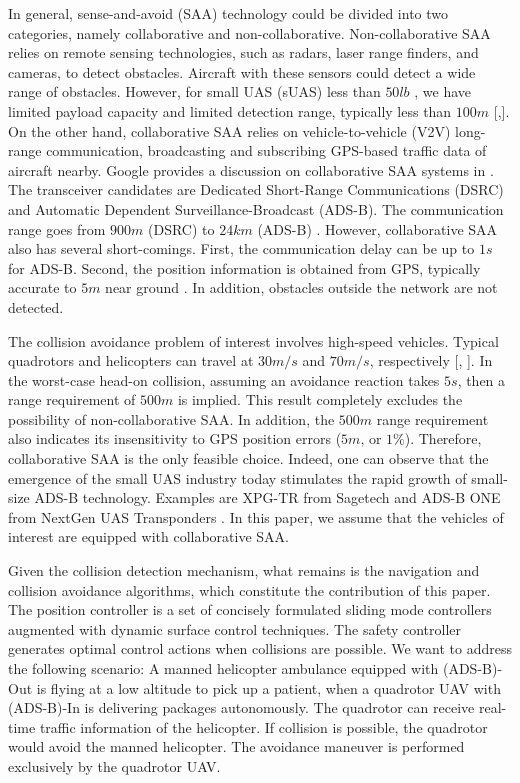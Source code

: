 \documentclass[journal,11pt,onecolumn,draftclsnofoot,]{IEEEtran}
\begin{document}
In general, sense-and-avoid (SAA) technology could be divided into two categories, namely collaborative and non-collaborative. Non-collaborative SAA relies on remote sensing technologies, such as radars, laser range finders, and cameras, to detect obstacles. Aircraft with these sensors could detect a wide range of obstacles. However, for small UAS (sUAS) less than $50lb$ \cite{faa-nprm}, we have limited payload capacity and limited detection range, typically less than $100m$ [,]. On the other hand, collaborative SAA relies on vehicle-to-vehicle (V2V) long-range communication, broadcasting and subscribing GPS-based traffic data of aircraft nearby. Google provides a discussion on collaborative SAA systems in \cite{google_airspace_system}. The transceiver candidates are Dedicated Short-Range Communications (DSRC) and Automatic Dependent Surveillance-Broadcast (ADS-B). The communication range goes from $900m$ (DSRC) \cite{msadaa2010comparative} to $24km$ (ADS-B) \cite{sagetech}. However, collaborative SAA also has several short-comings. First, the communication delay can be up to $1 s$ for ADS-B. Second, the position information is obtained from GPS, typically accurate to $5m$ near ground \cite{gps_accuracy}. In addition, obstacles outside the network are not detected. 

The collision avoidance problem of interest involves high-speed vehicles. Typical quadrotors and helicopters can travel at $30m/s$ and $70m/s$, respectively [, ]. In the worst-case head-on collision, assuming an avoidance reaction takes $5s$, then a range requirement of $500m$ is implied. This result completely excludes the possibility of non-collaborative SAA. In addition, the $500m$ range requirement also indicates its insensitivity to GPS position errors ($5m$, or $1\%$). Therefore, collaborative SAA is the only feasible choice. Indeed, one can observe that the emergence of the small UAS industry today stimulates the rapid growth of small-size ADS-B technology. Examples are XPG-TR from Sagetech \cite{sagetech} and ADS-B ONE from NextGen UAS Transponders \cite{ads-b-one}. In this paper, we assume that the vehicles of interest are equipped with collaborative SAA.

Given the collision detection mechanism, what remains is the navigation and collision avoidance algorithms, which constitute the contribution of this paper. The position controller is a set of concisely formulated sliding mode controllers augmented with dynamic surface control techniques. The safety controller generates optimal control actions when collisions are possible. We want to address the following scenario: A manned helicopter ambulance equipped with (ADS-B)-Out is flying at a low altitude to pick up a patient, when a quadrotor UAV with (ADS-B)-In is delivering packages autonomously. The quadrotor can receive real-time traffic information of the helicopter. If collision is possible, the quadrotor would avoid the manned helicopter. The avoidance maneuver is performed exclusively by the quadrotor UAV.
\end{document}
